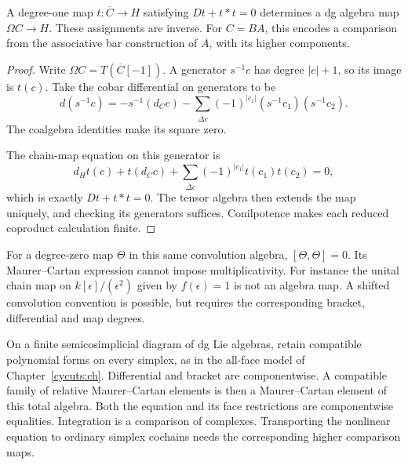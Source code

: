 \begin{lemma}\label{cycmp:lem:twisting-degree}
A degree-one map $t:\overline C\to H$ satisfying
$Dt+t*t=0$ determines a dg algebra map $\Omega C\to H$.
These assignments are inverse. For $C=BA$, this encodes a
comparison from the associative bar construction of $A$, with
its higher components.
\end{lemma}

\begin{proof}
Write $\Omega C=T(\overline C[-1])$. A generator $s^{-1}c$ has
degree $|c|+1$, so its image is $t(c)$. Take the cobar differential
on generators to be
\[
 d(s^{-1}c)=-s^{-1}(d_Cc)
       -\sum_{\overline\Delta c}
                  (-1)^{|c_1|}(s^{-1}c_1)(s^{-1}c_2).
\]
The coalgebra identities make its square zero.

The chain-map
equation on this generator is
\[
 d_Ht(c)+t(d_Cc)
       +\sum_{\overline\Delta c}(-1)^{|c_1|}t(c_1)t(c_2)=0,
\]
which is exactly $Dt+t*t=0$. The tensor algebra then extends the
map uniquely, and checking its generators suffices. Conilpotence
makes each reduced coproduct calculation finite.
\end{proof}

For a degree-zero map $\Theta$ in this same convolution algebra,
$[\Theta,\Theta]=0$. Its Maurer--Cartan expression cannot impose
multiplicativity. For instance the unital chain map on
$k[\epsilon]/(\epsilon^2)$ given by $f(\epsilon)=1$ is not an
algebra map. A shifted convolution convention is possible, but
requires the corresponding bracket, differential and map degrees.

On a finite semicosimplicial diagram of dg Lie algebras, retain
compatible polynomial forms on every simplex, as in the all-face
model of Chapter~\ref{cycuts:ch}. Differential and bracket are
componentwise. A compatible family of relative Maurer--Cartan
elements is then a Maurer--Cartan element of this total algebra.
Both the equation and its face restrictions are componentwise
equalities. Integration is a comparison of complexes. Transporting
the nonlinear equation to ordinary simplex cochains needs the
corresponding higher comparison maps.

